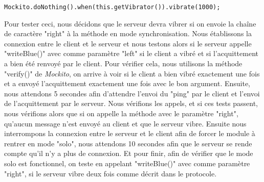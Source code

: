 \begin{lstlisting}
Mockito.doNothing().when(this.getVibrator()).vibrate(1000);
\end{lstlisting}\bigskip

Pour tester ceci, nous décidons que le serveur devra vibrer si on envoie la chaîne de caractère "right" à la méthode en mode synchronisation. Nous établissons la connexion entre le client et le serveur et nous testons alors si le serveur appelle "writeBlue()" avec comme paramètre "left" si le client a vibré et si l'acquittement a bien été renvoyé par le client. Pour vérifier cela, nous utilisons la méthode "verify()" de \textit{Mockito}, on arrive à voir si le client a bien vibré exactement une fois et a envoyé l'acquittement exactement une fois avec le bon argument. Ensuite, nous attendons 5 secondes afin d'attendre l'envoi du "ping" par le client et l'envoi de l'acquittement par le serveur. Nous vérifions les appels, et si ces tests passent, nous vérifions alors que si on appelle la méthode avec le paramètre "right", qu'aucun message n'est envoyé au client et que le serveur vibre. Ensuite nous interrompons la connexion entre le serveur et le client afin de forcer le module à rentrer en mode "solo", nous attendons 10 secondes afin que le serveur se rende compte qu'il n'y a plus de connexion. Et pour finir, afin de vérifier que le mode solo est fonctionnel, on teste en appelant "writeBlue()" avec comme paramètre "right", si le serveur vibre deux fois comme décrit dans le protocole.